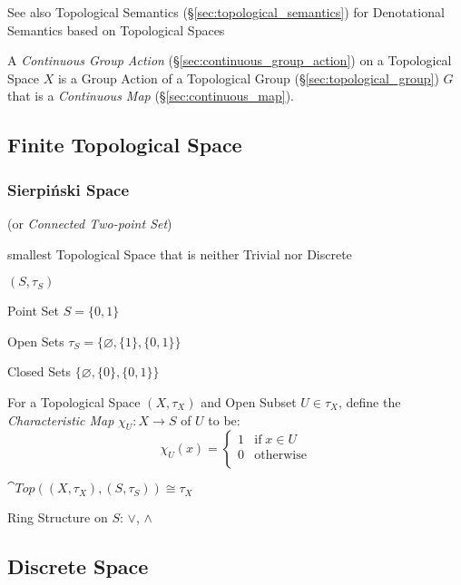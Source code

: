 \fist See also Topological Semantics
(\S\ref{sec:topological_semantics}) for Denotational Semantics based
on Topological Spaces

A \emph{Continuous Group Action} (\S\ref{sec:continuous_group_action}) on a
Topological Space $X$ is a Group Action of a Topological Group
(\S\ref{sec:topological_group}) $G$ that is a \emph{Continuous Map}
(\S\ref{sec:continuous_map}).



\subsection{Finite Topological Space}
\label{sec:finite_topological_space}

\subsubsection{Sierpi\'nski Space}\label{sec:sierpinski_space}

(or \emph{Connected Two-point Set})

smallest Topological Space that is neither Trivial nor Discrete

$(S,\tau_S)$

Point Set $S = \{0,1\}$

Open Sets $\tau_S = \{\varnothing, \{1\}, \{0,1\}\}$

Closed Sets $\{\varnothing, \{0\}, \{0,1\}\}$

For a Topological Space $(X,\tau_X)$ and Open Subset $U \in \tau_X$,
define the \emph{Characteristic Map} $\chi_U : X \rightarrow S$ of $U$ to be:
\[
  \chi_U (x) =
  \begin{cases}
    1  & \text{if}\; x \in U \\
    0  & \text{otherwise} \\
  \end{cases}
\]

$\cat{Top}((X,\tau_X),(S,\tau_S)) \cong \tau_X$

Ring Structure on $S$: $\vee$, $\wedge$



\subsection{Discrete Space}\label{sec:discrete_space}


